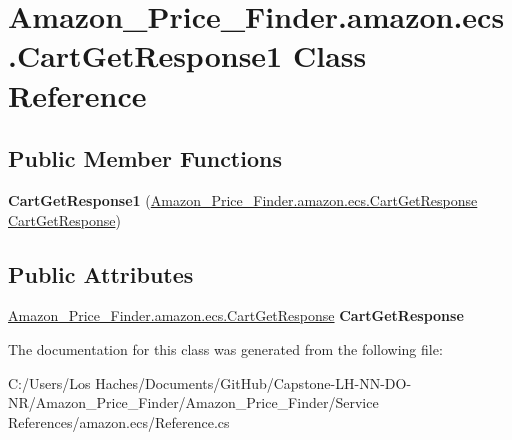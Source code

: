 \hypertarget{class_amazon___price___finder_1_1amazon_1_1ecs_1_1_cart_get_response1}{\section{Amazon\-\_\-\-Price\-\_\-\-Finder.\-amazon.\-ecs.\-Cart\-Get\-Response1 Class Reference}
\label{class_amazon___price___finder_1_1amazon_1_1ecs_1_1_cart_get_response1}
}
\subsection*{Public Member Functions}
\begin{DoxyCompactItemize}
\item 
\hypertarget{class_amazon___price___finder_1_1amazon_1_1ecs_1_1_cart_get_response1_abc6320acd3ba06739d7a44234fab04a3}{{\bfseries Cart\-Get\-Response1} (\hyperlink{class_amazon___price___finder_1_1amazon_1_1ecs_1_1_cart_get_response}{Amazon\-\_\-\-Price\-\_\-\-Finder.\-amazon.\-ecs.\-Cart\-Get\-Response} \hyperlink{class_amazon___price___finder_1_1amazon_1_1ecs_1_1_cart_get_response}{Cart\-Get\-Response})}\label{class_amazon___price___finder_1_1amazon_1_1ecs_1_1_cart_get_response1_abc6320acd3ba06739d7a44234fab04a3}

\end{DoxyCompactItemize}
\subsection*{Public Attributes}
\begin{DoxyCompactItemize}
\item 
\hypertarget{class_amazon___price___finder_1_1amazon_1_1ecs_1_1_cart_get_response1_af0cd4ca9588d50aa3799813fbb9a7d8d}{\hyperlink{class_amazon___price___finder_1_1amazon_1_1ecs_1_1_cart_get_response}{Amazon\-\_\-\-Price\-\_\-\-Finder.\-amazon.\-ecs.\-Cart\-Get\-Response} {\bfseries Cart\-Get\-Response}}\label{class_amazon___price___finder_1_1amazon_1_1ecs_1_1_cart_get_response1_af0cd4ca9588d50aa3799813fbb9a7d8d}

\end{DoxyCompactItemize}


The documentation for this class was generated from the following file\-:\begin{DoxyCompactItemize}
\item 
C\-:/\-Users/\-Los Haches/\-Documents/\-Git\-Hub/\-Capstone-\/\-L\-H-\/\-N\-N-\/\-D\-O-\/\-N\-R/\-Amazon\-\_\-\-Price\-\_\-\-Finder/\-Amazon\-\_\-\-Price\-\_\-\-Finder/\-Service References/amazon.\-ecs/Reference.\-cs\end{DoxyCompactItemize}

